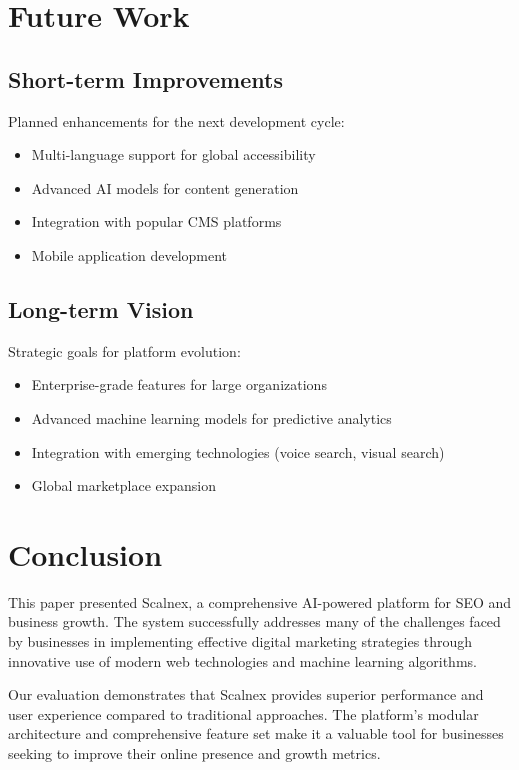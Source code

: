 \documentclass[11pt,a4paper]{article}
\begin{document}
\section{Future Work}
\label{sec:future_work}

\subsection{Short-term Improvements}
Planned enhancements for the next development cycle:

\begin{itemize}
    \item Multi-language support for global accessibility
    \item Advanced AI models for content generation
    \item Integration with popular CMS platforms
    \item Mobile application development
\end{itemize}

\subsection{Long-term Vision}
Strategic goals for platform evolution:

\begin{itemize}
    \item Enterprise-grade features for large organizations
    \item Advanced machine learning models for predictive analytics
    \item Integration with emerging technologies (voice search, visual search)
    \item Global marketplace expansion
\end{itemize}

\section{Conclusion}
\label{sec:conclusion}

This paper presented Scalnex, a comprehensive AI-powered platform for SEO and business growth. The system successfully addresses many of the challenges faced by businesses in implementing effective digital marketing strategies through innovative use of modern web technologies and machine learning algorithms.

Our evaluation demonstrates that Scalnex provides superior performance and user experience compared to traditional approaches. The platform's modular architecture and comprehensive feature set make it a valuable tool for businesses seeking to improve their online presence and growth metrics.
\end{document}
